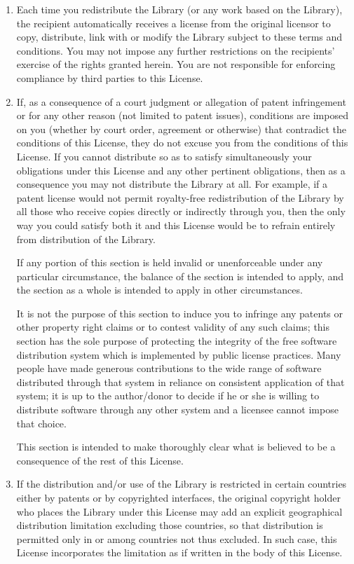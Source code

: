 \begin{enumerate}
\item Each time you redistribute the Library (or any work based on the
Library), the recipient automatically receives a license from the
original licensor to copy, distribute, link with or modify the Library
subject to these terms and conditions.  You may not impose any further
restrictions on the recipients' exercise of the rights granted herein.
You are not responsible for enforcing compliance by third parties to
this License.

\item If, as a consequence of a court judgment or allegation of patent
infringement or for any other reason (not limited to patent issues),
conditions are imposed on you (whether by court order, agreement or
otherwise) that contradict the conditions of this License, they do not
excuse you from the conditions of this License.  If you cannot
distribute so as to satisfy simultaneously your obligations under this
License and any other pertinent obligations, then as a consequence you
may not distribute the Library at all.  For example, if a patent
license would not permit royalty-free redistribution of the Library by
all those who receive copies directly or indirectly through you, then
the only way you could satisfy both it and this License would be to
refrain entirely from distribution of the Library.

If any portion of this section is held invalid or unenforceable under any
particular circumstance, the balance of the section is intended to apply,
and the section as a whole is intended to apply in other circumstances.

It is not the purpose of this section to induce you to infringe any
patents or other property right claims or to contest validity of any
such claims; this section has the sole purpose of protecting the
integrity of the free software distribution system which is
implemented by public license practices.  Many people have made
generous contributions to the wide range of software distributed
through that system in reliance on consistent application of that
system; it is up to the author/donor to decide if he or she is willing
to distribute software through any other system and a licensee cannot
impose that choice.

This section is intended to make thoroughly clear what is believed to
be a consequence of the rest of this License.

\item If the distribution and/or use of the Library is restricted in
certain countries either by patents or by copyrighted interfaces, the
original copyright holder who places the Library under this License may add
an explicit geographical distribution limitation excluding those countries,
so that distribution is permitted only in or among countries not thus
excluded.  In such case, this License incorporates the limitation as if
written in the body of this License.


\end{enumerate}
